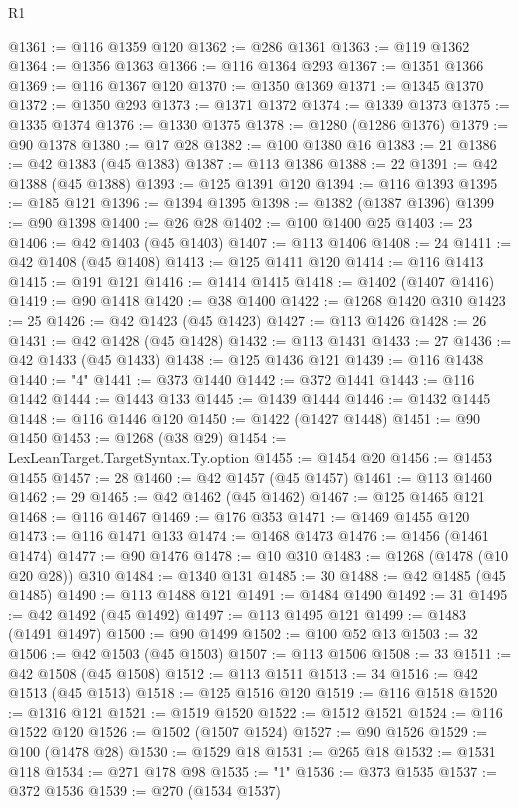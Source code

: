 \begin{lexlean}{R1}
\begin{coremodule}
@1361 := @116 @1359 @120
@1362 := @286 @1361
@1363 := @119 @1362
@1364 := @1356 @1363
@1366 := @116 @1364 @293
@1367 := @1351 @1366
@1369 := @116 @1367 @120
@1370 := @1350 @1369
@1371 := @1345 @1370
@1372 := @1350 @293
@1373 := @1371 @1372
@1374 := @1339 @1373
@1375 := @1335 @1374
@1376 := @1330 @1375
@1378 := @1280 (@1286 @1376)
@1379 := @90 @1378
@1380 := @17 @28
@1382 := @100 @1380 @16
@1383 := 21
@1386 := @42 @1383 (@45 @1383)
@1387 := @113 @1386
@1388 := 22
@1391 := @42 @1388 (@45 @1388)
@1393 := @125 @1391 @120
@1394 := @116 @1393
@1395 := @185 @121
@1396 := @1394 @1395
@1398 := @1382 (@1387 @1396)
@1399 := @90 @1398
@1400 := @26 @28
@1402 := @100 @1400 @25
@1403 := 23
@1406 := @42 @1403 (@45 @1403)
@1407 := @113 @1406
@1408 := 24
@1411 := @42 @1408 (@45 @1408)
@1413 := @125 @1411 @120
@1414 := @116 @1413
@1415 := @191 @121
@1416 := @1414 @1415
@1418 := @1402 (@1407 @1416)
@1419 := @90 @1418
@1420 := @38 @1400
@1422 := @1268 @1420 @310
@1423 := 25
@1426 := @42 @1423 (@45 @1423)
@1427 := @113 @1426
@1428 := 26
@1431 := @42 @1428 (@45 @1428)
@1432 := @113 @1431
@1433 := 27
@1436 := @42 @1433 (@45 @1433)
@1438 := @125 @1436 @121
@1439 := @116 @1438
@1440 := "4"
@1441 := @373 @1440
@1442 := @372 @1441
@1443 := @116 @1442
@1444 := @1443 @133
@1445 := @1439 @1444
@1446 := @1432 @1445
@1448 := @116 @1446 @120
@1450 := @1422 (@1427 @1448)
@1451 := @90 @1450
@1453 := @1268 (@38 @29)
@1454 := LexLeanTarget.TargetSyntax.Ty.option
@1455 := @1454 @20
@1456 := @1453 @1455
@1457 := 28
@1460 := @42 @1457 (@45 @1457)
@1461 := @113 @1460
@1462 := 29
@1465 := @42 @1462 (@45 @1462)
@1467 := @125 @1465 @121
@1468 := @116 @1467
@1469 := @176 @353
@1471 := @1469 @1455 @120
@1473 := @116 @1471 @133
@1474 := @1468 @1473
@1476 := @1456 (@1461 @1474)
@1477 := @90 @1476
@1478 := @10 @310
@1483 := @1268 (@1478 (@10 @20 @28)) @310
@1484 := @1340 @131
@1485 := 30
@1488 := @42 @1485 (@45 @1485)
@1490 := @113 @1488 @121
@1491 := @1484 @1490
@1492 := 31
@1495 := @42 @1492 (@45 @1492)
@1497 := @113 @1495 @121
@1499 := @1483 (@1491 @1497)
@1500 := @90 @1499
@1502 := @100 @52 @13
@1503 := 32
@1506 := @42 @1503 (@45 @1503)
@1507 := @113 @1506
@1508 := 33
@1511 := @42 @1508 (@45 @1508)
@1512 := @113 @1511
@1513 := 34
@1516 := @42 @1513 (@45 @1513)
@1518 := @125 @1516 @120
@1519 := @116 @1518
@1520 := @1316 @121
@1521 := @1519 @1520
@1522 := @1512 @1521
@1524 := @116 @1522 @120
@1526 := @1502 (@1507 @1524)
@1527 := @90 @1526
@1529 := @100 (@1478 @28)
@1530 := @1529 @18
@1531 := @265 @18
@1532 := @1531 @118
@1534 := @271 @178 @98
@1535 := "1"
@1536 := @373 @1535
@1537 := @372 @1536
@1539 := @270 (@1534 @1537)

\end{coremodule}
\end{lexlean}
